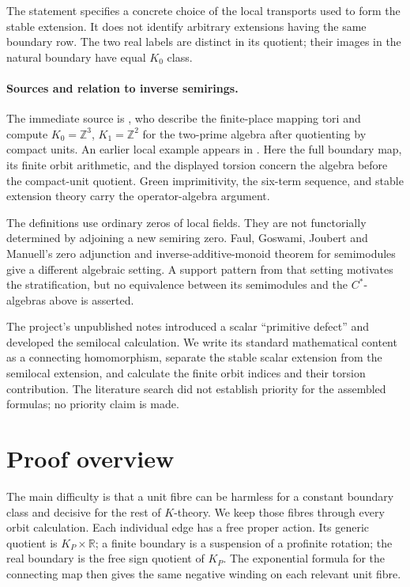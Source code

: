 \documentclass[11pt]{article}
\newcommand{\Z}{\mathbb Z}
\newcommand{\R}{\mathbb R}
\theoremstyle{definition}
\theoremstyle{remark}
\begin{document}
The statement specifies a concrete choice of the local transports used to form the stable extension. It does not identify arbitrary extensions having the same boundary row. The two real labels are distinct in its quotient; their images in the natural boundary have equal $K_0$ class.

\paragraph{Sources and relation to inverse semirings.}
The immediate source is \citet[\S5.3, Proposition 5.4, pp.~23--24; \S5.4, Lemmas 5.5--5.6, pp.~25--28]{CC}, who describe the finite-place mapping tori and compute $K_0=\Z^3$, $K_1=\Z^2$ for the two-prime algebra after quotienting by compact units. An earlier local example appears in \citet[\S10.2, equations (10.10)--(10.19)]{CCM}. Here the full boundary map, its finite orbit arithmetic, and the displayed torsion concern the algebra before the compact-unit quotient. Green imprimitivity, the six-term sequence, and stable extension theory carry the operator-algebra argument.

The definitions use ordinary zeros of local fields. They are not functorially determined by adjoining a new semiring zero. Faul, Goswami, Joubert and Manuell's zero adjunction \citep[Definition 3.6]{FGJM} and inverse-additive-monoid theorem for semimodules \citep[Proposition 6.1]{FGJM} give a different algebraic setting. A support pattern from that setting motivates the stratification, but no equivalence between its semimodules and the $C^*$-algebras above is asserted.

The project's unpublished notes introduced a scalar ``primitive defect'' and developed the semilocal calculation. We write its standard mathematical content as a connecting homomorphism, separate the stable scalar extension from the semilocal extension, and calculate the finite orbit indices and their torsion contribution. The literature search did not establish priority for the assembled formulas; no priority claim is made.

\section{Proof overview}

The main difficulty is that a unit fibre can be harmless for a constant boundary class and decisive for the rest of $K$-theory. We keep those fibres through every orbit calculation. Each individual edge has a free proper action. Its generic quotient is $K_P\times\R$; a finite boundary is a suspension of a profinite rotation; the real boundary is the free sign quotient of $K_P$. The exponential formula for the connecting map then gives the same negative winding on each relevant unit fibre.
\end{document}
